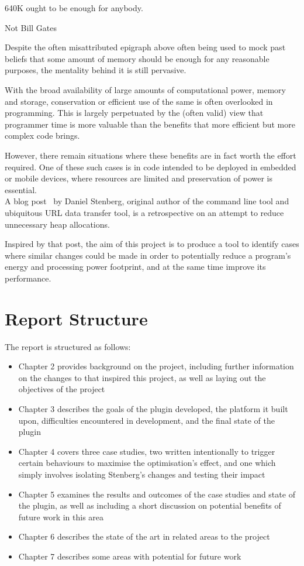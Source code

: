 \epigraph{640K ought to be enough for anybody.}{Not Bill Gates}

Despite the often misattributed epigraph above often being used to mock past beliefs that some amount of memory should be enough for any reasonable purposes, the mentality behind it is still pervasive.

With the broad availability of large amounts of computational power, memory and storage, conservation or efficient use of the same is often overlooked in programming. This is largely perpetuated by the (often valid) view that programmer time is more valuable than the benefits that more efficient but more complex code brings.

However, there remain situations where these benefits are in fact worth the effort required. One of these such cases is in code intended to be deployed in embedded or mobile devices, where resources are limited and preservation of power is essential. \\
A blog post~\cite{curlmalloc} by Daniel Stenberg, original author of the  command line tool and ubiquitous URL data transfer tool, is a retrospective on an attempt to reduce unnecessary heap allocations.

Inspired by that post, the aim of this project is to produce a tool to identify cases where similar changes could be made in order to potentially reduce a program's energy and processing power footprint, and at the same time improve its performance.

\section{Report Structure}

The report is structured as follows:

\begin{itemize}
	\item{Chapter 2 provides background on the project, including further information on the changes to  that inspired this project, as well as laying out the objectives of the project}
	\item{Chapter 3 describes the goals of the plugin developed, the platform it built upon, difficulties encountered in development, and the final state of the plugin}
	\item{Chapter 4 covers three case studies, two written intentionally to trigger certain behaviours to maximise the optimisation's effect, and one which simply involves isolating Stenberg's changes and testing their impact}
	\item{Chapter 5 examines the results and outcomes of the case studies and state of the plugin, as well as including a short discussion on potential benefits of future work in this area}
	\item{Chapter 6 describes the state of the art in related areas to the project}
	\item{Chapter 7 describes some areas with potential for future work}
\end{itemize}
